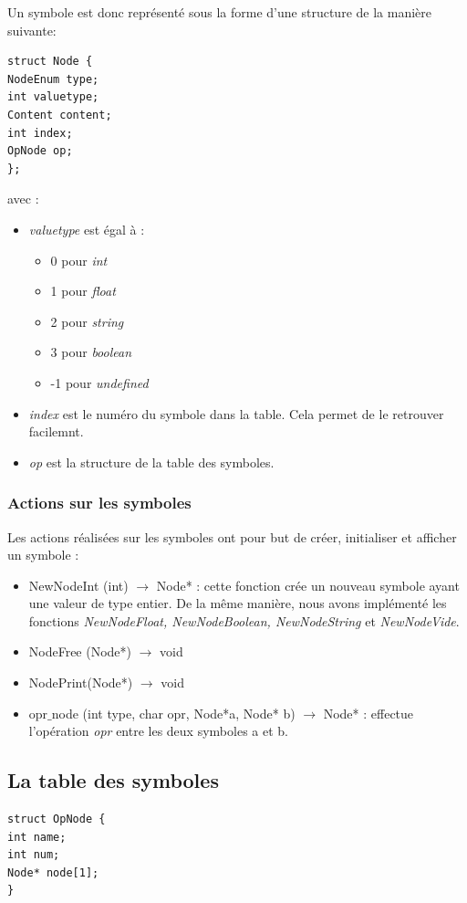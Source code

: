\documentclass{article}
\begin{document}
Un symbole est donc représenté sous la forme d'une structure de la manière suivante:  
\begin{verbatim}
struct Node { 
NodeEnum type; 
int valuetype; 
Content content; 
int index; 
OpNode op;
};
\end{verbatim}

avec :
\begin{itemize}
\item \emph{valuetype} est égal à :
\begin{itemize}
\item 0 pour \emph{int} 
\item 1 pour \emph{float} 
\item 2 pour \emph{string}
\item 3 pour \emph{boolean}
\item -1 pour \emph{undefined}
\end{itemize}
\item \emph{index} est le numéro du symbole dans la table. Cela permet de le retrouver facilemnt. 
\item \emph{op} est la structure de la table des symboles. 
\end{itemize}

\subsubsection*{Actions sur les symboles}
Les actions réalisées sur les symboles ont pour but de créer, initialiser et afficher un symbole : \\
\begin{itemize}
\item NewNodeInt (int) $\rightarrow$ Node* : cette fonction crée un nouveau symbole ayant une valeur de type entier. De la même manière, nous avons implémenté les fonctions \emph{NewNodeFloat, NewNodeBoolean, NewNodeString} et \emph{NewNodeVide}.
\item NodeFree (Node*) $\rightarrow$ void
\item NodePrint(Node*) $\rightarrow$ void
\item opr$\_$node (int type, char opr, Node*a, Node* b) $\rightarrow$ Node* : effectue l'opération \emph{opr} entre les deux symboles a et b.
\end{itemize}


\subsection{La table des symboles}
\begin{verbatim}
struct OpNode {
int name;
int num;
Node* node[1];
}
\end{verbatim}
\end{document}
